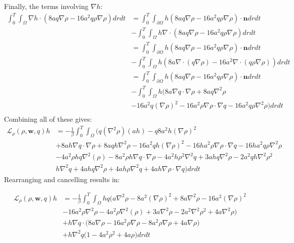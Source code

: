 \documentclass[11pt, a4paper]{article}
\theoremstyle{definition}
\newcommand{\w}{\mathbf{w}}
\newcommand{\n}{\mathbf{n}}
\begin{document}
Finally, the terms involving $\nabla h$:
\begin{align*}
\int_0^T \int_\Omega \nabla h \cdot \left( 8a q\nabla \rho - 16 a^2 q \rho \nabla \rho  \right) dr dt &= \int_0^T \int_{\partial \Omega}  h \left( 8a q \nabla \rho - 16 a^2 q\rho \nabla \rho  \right) \cdot \n dr dt \\
&- \int_0^T \int_\Omega h \nabla \cdot\left( 8a q \nabla \rho - 16 a^2 q\rho \nabla \rho  \right) dr dt\\
& = \int_0^T \int_{\partial \Omega}  h \left( 8a q\nabla \rho - 16 a^2 q \rho \nabla \rho  \right) \cdot \n dr dt \\
&- \int_0^T \int_\Omega h \left( 8a \nabla \cdot( q \nabla \rho) - 16 a^2 \nabla \cdot (q\rho \nabla \rho ) \right) dr dt\\
& = \int_0^T \int_{\partial \Omega}  h \left( 8a q\nabla \rho - 16 a^2 q \rho \nabla \rho  \right) \cdot \n dr dt \\
&- \int_0^T \int_\Omega h \bigg( 8a \nabla q \cdot \nabla \rho + 8aq \nabla^2 \rho  \\
&- 16 a^2 q (\nabla \rho)^2 - 16 a^2 \rho \nabla \rho \cdot \nabla q - 16 a^2 q \rho \nabla^2 \rho \bigg) dr dt\\
\end{align*}
Combining all of these gives:
\begin{align*}
\mathcal{L}_\rho(\rho, \w, q) h &= -\frac{1}{\beta}  \int_0^T \int_\Omega \bigg(q (\nabla^2 \rho) ( a h )  -q 8a^2 h \left(\nabla \rho\right)^2   \\
&+  8a h\nabla q \cdot \nabla \rho + 8aq h\nabla^2 \rho - 16 a^2 q h(\nabla \rho)^2 - 16h a^2 \rho \nabla \rho \cdot \nabla q - 16 ha^2 q \rho \nabla^2 \rho \\
& - 4a^2 \rho h q\nabla^2(\rho ) - 8a^2 \rho h \nabla q \cdot \nabla \rho  - 4a^2 h \rho^2 \nabla^2 q  + 3ah q\nabla^2 \rho - 2a^2qh \nabla^2 \rho^2\\
&h\nabla^2 q + 4 a h q \nabla^2 \rho + 4 a h  \rho \nabla^2 q + 4 a h \nabla \rho \cdot \nabla q \bigg)  dr dt
\end{align*}
Rearranging and cancelling results in:

\begin{align*}
\mathcal{L}_\rho(\rho, \w, q) h &= -\frac{1}{\beta}  \int_0^T \int_\Omega h q \bigg( a\nabla^2 \rho -8a^2  \left(\nabla \rho\right)^2 + 8a\nabla^2 \rho - 16 a^2 (\nabla \rho)^2 \\
&- 16 a^2  \rho \nabla^2 \rho - 4a^2 \rho \nabla^2(\rho ) +3a\nabla^2 \rho - 2a^2 \nabla^2 \rho^2 + 4 a \nabla^2 \rho
 \bigg)\\
&+ h \nabla q \cdot \bigg( 8a \nabla \rho - 16 a^2 \rho \nabla \rho- 8a^2 \rho  \nabla \rho + 4 a  \nabla \rho \bigg)\\
&+ h \nabla^2 q \bigg( 1  - 4a^2  \rho^2  + 4 a   \rho  \bigg) dr dt
\end{align*}
\end{document}
